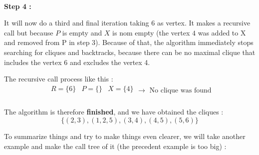    \\
    \hspace*{1cm}  \textbf{Step 4 :}
    \\
    \begin{minipage}{0.4\textwidth}
    \end{minipage}
    \begin{minipage}{0.6\textwidth}
        It will now do a third and final iteration taking 6 as vertex. It makes a recursive call but because $P$ is empty and $X$ is nom empty (the vertex $4$ was added to X and removed from P in step 3). Because of that, the algorithm immediately stops searching for cliques and backtracks, because there can be no maximal clique that includes the  vertex 6 and excludes the vertex 4.
    \end{minipage}
    The recursive call process like this  :
    $$ \boxed{
        \begin{array}{lll}
            R = \{6\} & P = \{\} & X = \{4\} \\
        \end{array} 
        \rightarrow \text{ No clique was found}
    }$$
    \\
    The algorithm is therefore \textbf{finished}, and we have obtained the cliques :
    $$\{(2,3),(1,2,5),(3,4),(4,5),(5,6)\}$$ 

    To summarize things and try to make things even clearer, we will take another example and make the call tree of it (the precedent example is too big) :

